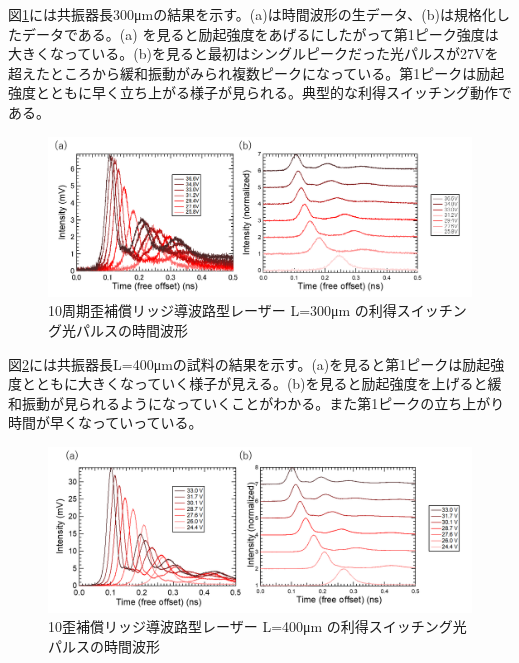 {図\ref{fig:fig_3_2_10QW_ridge_L300_GS}には共振器長300\si{\micro\metre}の結果を示す。(a)は時間波形の生データ、(b)は規格化したデータである。(a) を見ると励起強度をあげるにしたがって第1ピーク強度は大きくなっている。(b)を見ると最初はシングルピークだった光パルスが27Vを超えたところから緩和振動がみられ複数ピークになっている。第1ピークは励起強度とともに早く立ち上がる様子が見られる。典型的な利得スイッチング動作である。
\begin{figure}[h]
	\centering
	\includegraphics[width=15cm]{figure/fig_3_2_10QW_ridge_L300_GS.png}
		\caption{10周期歪補償リッジ導波路型レーザー L=300\si{\micro\metre} の利得スイッチング光パルスの時間波形}
		\label{fig:fig_3_2_10QW_ridge_L300_GS}
\end{figure}


図\ref{fig:fig_3_2_10QW_ridge_L400_GS}には共振器長L=400\si{\micro\metre}の試料の結果を示す。(a)を見ると第1ピークは励起強度とともに大きくなっていく様子が見える。(b)を見ると励起強度を上げると緩和振動が見られるようになっていくことがわかる。また第1ピークの立ち上がり時間が早くなっていっている。
\begin{figure}[h]
	\centering
	\includegraphics[width=15cm]{figure/fig_3_2_10QW_ridge_L400_GS.png}
		\caption{10歪補償リッジ導波路型レーザー L=400\si{\micro\metre} の利得スイッチング光パルスの時間波形}
		\label{fig:fig_3_2_10QW_ridge_L400_GS}
\end{figure}

}
